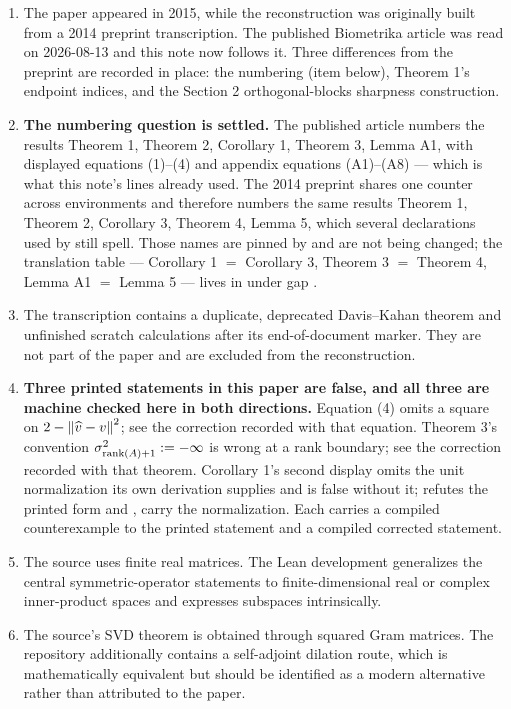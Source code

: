 \begin{enumerate}[leftmargin=2em]
\item The paper appeared in 2015, while the reconstruction was originally built from a 2014 preprint transcription. The published Biometrika article was read on 2026-08-13 and this note now follows it. Three differences from the preprint are recorded in place: the numbering (item below), Theorem 1's endpoint indices, and the Section 2 orthogonal-blocks sharpness construction.
\item \textbf{The numbering question is settled.} The published article numbers the results Theorem 1, Theorem 2, Corollary 1, Theorem 3, Lemma A1, with displayed equations (1)--(4) and appendix equations (A1)--(A8) --- which is what this note's  lines already used. The 2014 preprint shares one counter across environments and therefore numbers the same results Theorem 1, Theorem 2, Corollary 3, Theorem 4, Lemma 5, which several declarations used by  still spell. Those names are pinned by  and are not being changed; the translation table --- Corollary 1 $=$ Corollary 3, Theorem 3 $=$ Theorem 4, Lemma A1 $=$ Lemma 5 --- lives in  under gap .
\item The transcription contains a duplicate, deprecated Davis--Kahan theorem and unfinished scratch calculations after its end-of-document marker. They are not part of the paper and are excluded from the reconstruction.
\item \textbf{Three printed statements in this paper are false, and all three are machine checked here in both directions.} Equation (4) omits a square on $2-\left\lVert \widehat v-v\right\rVert^2$; see the correction recorded with that equation. Theorem 3's convention $\sigma_{\operatorname{rank}(A)+1}^2:=-\infty$ is wrong at a rank boundary; see the correction recorded with that theorem. Corollary 1's second display omits the unit normalization its own derivation supplies and is false without it;  refutes the printed form and ,  carry the normalization. Each carries a compiled counterexample to the printed statement and a compiled corrected statement.
\item The source uses finite real matrices. The Lean development generalizes the central symmetric-operator statements to finite-dimensional real or complex inner-product spaces and expresses subspaces intrinsically.
\item The source's SVD theorem is obtained through squared Gram matrices. The repository additionally contains a self-adjoint dilation route, which is mathematically equivalent but should be identified as a modern alternative rather than attributed to the paper.
\end{enumerate}

